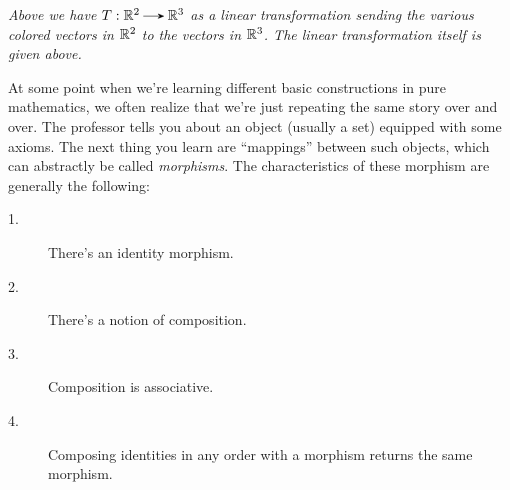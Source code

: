 \begin{center}
        \emph{Above we have $T: \rr^2 \to \rr^3$ as a linear transformation 
        sending the various colored vectors in $\mathbb{R}^2$ to the vectors in $\mathbb{R}^3$.
        The linear transformation itself is given above.
        }
    \end{center}
    At some point when we're learning different basic constructions in 
    pure mathematics, we often realize that we're just 
    repeating the same story over and over. The professor tells you about 
    an object (usually a set) equipped with some axioms. The next thing you learn 
    are ``mappings'' between such objects, which can abstractly be called \emph{morphisms}.
    The characteristics of these morphism
    are generally the following:
    \begin{description}
        \item[1.] There's an identity morphism.
        \item[2.] There's a notion of composition. 
        \item[3.] Composition is associative. 
        \item[4.] Composing identities in any order with a morphism 
        returns the same morphism. 
    \end{description}

